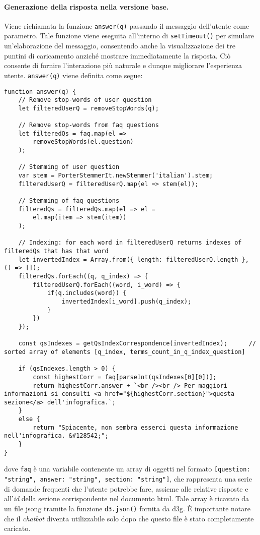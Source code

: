 \paragraph{Generazione della risposta nella versione base.} Viene richiamata la funzione \texttt{answer(q)} passando il messaggio dell'utente come parametro. Tale funzione viene eseguita all'interno di \texttt{setTimeout()} per simulare un'elaborazione 
del messaggio, consentendo anche la visualizzazione dei tre puntini di caricamento anziché mostrare immediatamente la risposta. Ciò consente di fornire l'interazione più naturale e dunque migliorare l'esperienza utente.
\texttt{answer(q)} viene definita come segue:
\begin{lstlisting}[style=htmlcssjs]
function answer(q) {   
    // Remove stop-words of user question
    let filteredUserQ = removeStopWords(q);

    // Remove stop-words from faq questions
    let filteredQs = faq.map(el => 
        removeStopWords(el.question)
    );

    // Stemming of user question
    var stem = PorterStemmerIt.newStemmer('italian').stem;
    filteredUserQ = filteredUserQ.map(el => stem(el));

    // Stemming of faq questions
    filteredQs = filteredQs.map(el => el =
        el.map(item => stem(item))
    );

    // Indexing: for each word in filteredUserQ returns indexes of filteredQs that has that word
    let invertedIndex = Array.from({ length: filteredUserQ.length }, () => []);
    filteredQs.forEach((q, q_index) => {
        filteredUserQ.forEach((word, i_word) => {
            if(q.includes(word)) {
                invertedIndex[i_word].push(q_index);
            }
        })
    });

    const qsIndexes = getQsIndexCorrespondence(invertedIndex);      // sorted array of elements [q_index, terms_count_in_q_index_question]

    if (qsIndexes.length > 0) {
        const highestCorr = faq[parseInt(qsIndexes[0][0])];
        return highestCorr.answer + `<br /><br /> Per maggiori informazioni si consulti <a href="${highestCorr.section}">questa sezione</a> dell'infografica.`;
    }
    else {
        return "Spiacente, non sembra esserci questa informazione nell'infografica. &#128542;";
    }
}
\end{lstlisting}
dove \texttt{faq} è una variabile contenente un array di oggetti nel formato \texttt{[{question: "string", answer: "string", section: "string"}]}, che rappresenta una serie di domande frequenti che l'utente potrebbe fare, 
assieme alle relative risposte e all'\emph{id} della sezione corrispondente nel documento \gls{html}. Tale array è ricavato da un file \gls{jsong} tramite la funzione \texttt{d3.json()} fornita da \gls{d3g}. 
È importante notare che il \emph{chatbot} diventa utilizzabile solo dopo che questo file è stato completamente caricato.

